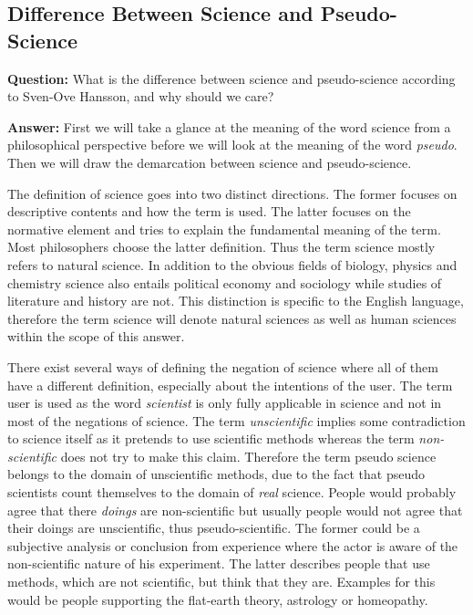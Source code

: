 \documentclass[11pt]{scrartcl}
\begin{document}
\subsection{Difference Between Science and Pseudo-Science}

\textbf{Question:} What is the difference between science and pseudo-science according to Sven-Ove Hansson, and why should we care?

\bigbreak

\textbf{Answer:} First we will take a glance at the meaning of the word science from a philosophical perspective before we will look at the meaning of the word \textit{pseudo}. Then we will draw the demarcation between science and pseudo-science.

The definition of science goes into two distinct directions. The former focuses on descriptive contents and how the term is used. The latter focuses on the normative element and tries to explain the fundamental meaning of the term. Most philosophers choose the latter definition. Thus the term science mostly refers to natural science. In addition to the obvious fields of biology, physics and chemistry science also entails political economy and sociology while studies of literature and history are not. This distinction is specific to the English language, therefore the term science will denote natural sciences as well as human sciences within the scope of this answer.

There exist several ways of defining the negation of science where all of them have a different definition, especially about the intentions of the user. The term user is used as the word \textit{scientist} is only fully applicable in science and not in most of the negations of science. The term \textit{unscientific} implies some contradiction to science itself as it pretends to use scientific methods whereas the term \textit{non-scientific} does not try to make this claim. Therefore the term pseudo science belongs to the domain of unscientific methods, due to the fact that pseudo scientists count themselves to the domain of \textit{real} science. People would probably agree that there \textit{doings} are non-scientific but usually people would not agree that their doings are unscientific, thus pseudo-scientific. The former could be a subjective analysis or conclusion from experience where the actor is aware of the non-scientific nature of his experiment. The latter describes people that use methods, which are not scientific, but think that they are. Examples for this would be people supporting the flat-earth theory, astrology or homeopathy.
\end{document}
